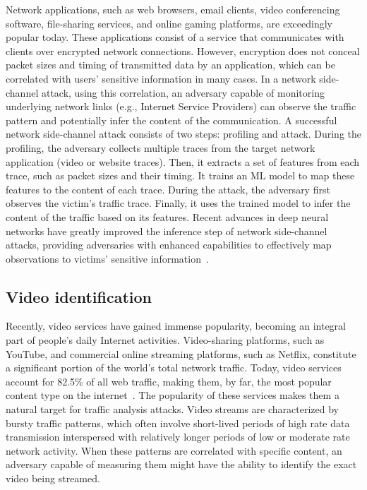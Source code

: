 Network applications, such as web browsers, email clients, video conferencing software, file-sharing services, and online gaming platforms, are exceedingly popular today.
These applications consist of a service that communicates with clients over encrypted network connections.
However, encryption does not conceal packet sizes and timing of transmitted data by an application, which can be correlated with users' sensitive information in many cases.
In a network side-channel attack, using this correlation, an adversary capable of monitoring underlying network links (e.g., Internet Service Providers) can observe the traffic pattern and potentially infer the content of the communication.
A successful network side-channel attack consists of two steps: profiling and attack.
During the profiling, the adversary collects multiple traces from the target network application (\eg video or website traces). 
Then, it extracts a set of features from each trace, such as packet sizes and their timing.
It trains an ML model to map these features to the content of each trace.
During the attack, the adversary first observes the victim's traffic trace. 
Finally, it uses the trained model to infer the content of the traffic based on its features.
Recent advances in deep neural networks have greatly improved the inference step of network side-channel attacks, providing adversaries with enhanced capabilities to effectively map observations to victims' sensitive information~\cite{schuster2017beautyburst, bhat2019varcnn, hayes2016kfp, sirinam2018df}.



\subsection{Video identification}\label{subsec:video-classification}
Recently, video services have gained immense popularity, becoming an integral part of people's daily Internet activities.
Video-sharing platforms, such as YouTube, and commercial online streaming platforms, such as Netflix, constitute a significant portion of the world's total network traffic.
Today, video services account for 82.5\% of all web traffic, making them, by far, the most popular content type on the internet~\cite{webstat}.
The popularity of these services makes them a natural target for traffic analysis attacks.
Video streams are characterized by bursty traffic patterns, which often involve short-lived periods of high rate data transmission interspersed with relatively longer periods of low or moderate rate network activity.
When these patterns are correlated with specific content, an adversary capable of measuring them might have the ability to identify the exact video being streamed.

